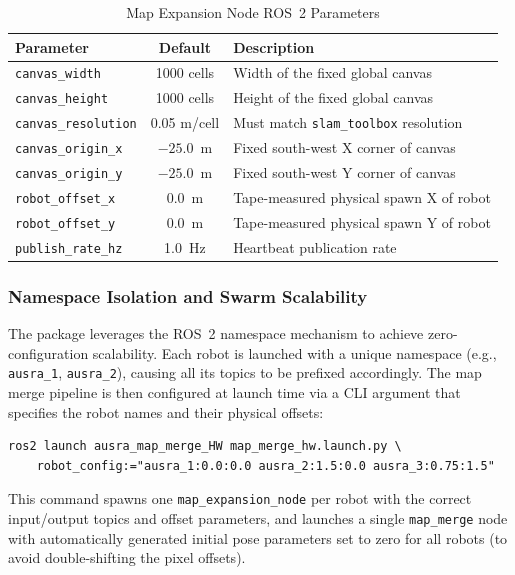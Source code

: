 \begin{table}[H]
\centering
\caption{Map Expansion Node ROS~2 Parameters}
\label{tab:map_merge_params}
\begin{tabular}{|l|c|p{6cm}|}
\hline
\textbf{Parameter} & \textbf{Default} & \textbf{Description} \\
\hline
\texttt{canvas\_width} & 1000 cells & Width of the fixed global canvas \\
\hline
\texttt{canvas\_height} & 1000 cells & Height of the fixed global canvas \\
\hline
\texttt{canvas\_resolution} & 0.05 m/cell & Must match \texttt{slam\_toolbox} resolution \\
\hline
\texttt{canvas\_origin\_x} & $-25.0$~m & Fixed south-west X corner of canvas \\
\hline
\texttt{canvas\_origin\_y} & $-25.0$~m & Fixed south-west Y corner of canvas \\
\hline
\texttt{robot\_offset\_x} & 0.0~m & Tape-measured physical spawn X of robot \\
\hline
\texttt{robot\_offset\_y} & 0.0~m & Tape-measured physical spawn Y of robot \\
\hline
\texttt{publish\_rate\_hz} & 1.0~Hz & Heartbeat publication rate \\
\hline
\end{tabular}
\end{table}

\subsubsection{Namespace Isolation and Swarm Scalability}

The package leverages the ROS~2 namespace mechanism to achieve zero-configuration scalability. Each robot is launched with a unique namespace (e.g., \texttt{ausra\_1}, \texttt{ausra\_2}), causing all its topics to be prefixed accordingly. The map merge pipeline is then configured at launch time via a CLI argument that specifies the robot names and their physical offsets:

\begin{verbatim}
ros2 launch ausra_map_merge_HW map_merge_hw.launch.py \
    robot_config:="ausra_1:0.0:0.0 ausra_2:1.5:0.0 ausra_3:0.75:1.5"
\end{verbatim}

This command spawns one \texttt{map\_expansion\_node} per robot with the correct input/output topics and offset parameters, and launches a single \texttt{map\_merge} node with automatically generated initial pose parameters set to zero for all robots (to avoid double-shifting the pixel offsets).

